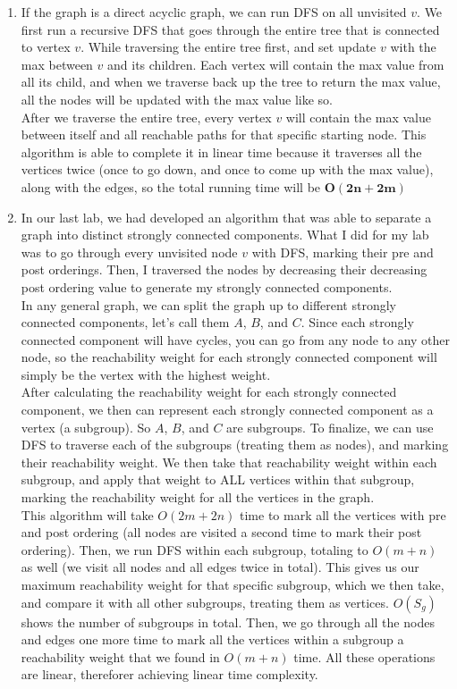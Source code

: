 \documentclass{article}
\begin{document}
\begin{enumerate}
        \begin{enumerate}
            \item If the graph is a direct acyclic graph, we can run DFS on all unvisited $v$. We first run a recursive DFS that goes through the entire tree that is connected to vertex $v$. While traversing the entire tree first, and set update $v$ with the max between $v$ and its children. Each vertex will contain the max value from all its child, and when we traverse back up the tree to return the max value, all the nodes will be updated with the max value like so.\\
            After we traverse the entire tree, every vertex $v$ will contain the max value between itself and all reachable paths for that specific starting node. This algorithm is able to complete it in linear time because it traverses all the vertices twice (once to go down, and once to come up with the max value), along with the edges, so the total running time will be $\boxed{\mathbf{O(2n + 2m)}}$
            \item In our last lab, we had developed an algorithm that was able to separate a graph into distinct strongly connected components. What I did for my lab was to go through every unvisited node $v$ with DFS, marking their pre and post orderings. Then, I traversed the nodes by decreasing their decreasing post ordering value to generate my strongly connected components.\\
            In any general graph, we can split the graph up to different strongly connected components, let's call them $A$, $B$, and $C$. Since each strongly connected component will have cycles, you can go from any node to any other node, so the reachability weight for each strongly connected component will simply be the vertex with the highest weight.\\
            After calculating the reachability weight for each strongly connected component, we then can represent each strongly connected component as a vertex (a subgroup). So $A$, $B$, and $C$ are subgroups. To finalize, we can use DFS to traverse each of the subgroups (treating them as nodes), and marking their reachability weight. We then take that reachability weight within each subgroup, and apply that weight to ALL vertices within that subgroup, marking the reachability weight for all the vertices in the graph.\\
            This algorithm will take $O(2m + 2n)$ time to mark all the vertices with pre and post ordering (all nodes are visited a second time to mark their post ordering). Then, we run DFS within each subgroup, totaling to $O(m + n)$ as well (we visit all nodes and all edges twice in total). This gives us our maximum reachability weight for that specific subgroup, which we then take, and compare it with all other subgroups, treating them as vertices. $O(S_g)$ shows the number of subgroups in total. Then, we go through all the nodes and edges one more time to mark all the vertices within a subgroup a reachability weight that we found in $O(m + n)$ time. All these operations are linear, thereforer achieving linear time complexity.
        \end{enumerate}

        
    \end{enumerate} 
\end{document}
